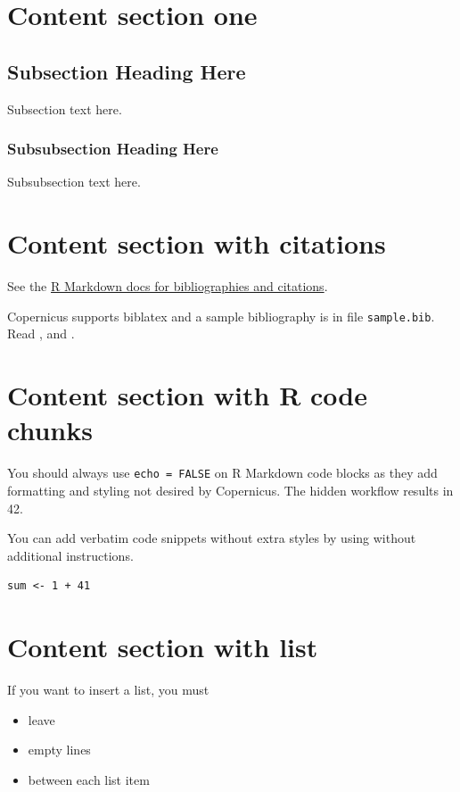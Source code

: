 \documentclass[gc, manuscript, english]{copernicus}
\begin{document}
\section{Content section one}

\subsection{Subsection Heading Here}

Subsection text here.

\subsubsection{Subsubsection Heading Here}

Subsubsection text here.

\section{Content section with citations}

See the
\href{http://rmarkdown.rstudio.com/authoring_bibliographies_and_citations.html}{R
Markdown docs for bibliographies and citations}.

Copernicus supports biblatex and a sample bibliography is in file
\texttt{sample.bib}. Read \citep{Feynman1963118}, and
\citep[see][]{Dirac1953888}.

\section{Content section with R code chunks}

You should always use \texttt{echo\ =\ FALSE} on R Markdown code blocks
as they add formatting and styling not desired by Copernicus. The hidden
workflow results in 42.

You can add verbatim code snippets without extra styles by using
\texttt{\textasciigrave{}\textasciigrave{}\textasciigrave{}} without
additional instructions.

\begin{verbatim}
sum <- 1 + 41
\end{verbatim}

\section{Content section with list}

If you want to insert a list, you must

\begin{itemize}
\item
  leave
\item
  empty lines
\item
  between each list item
\end{itemize}
\end{document}
